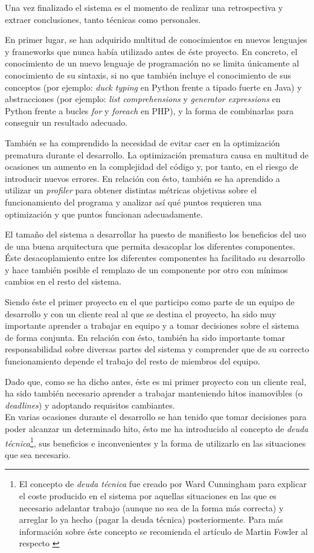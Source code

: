 Una vez finalizado el sistema es el momento de realizar una retrospectiva y extraer
conclusiones, tanto técnicas como personales.

En primer lugar, se han adquirido multitud de conocimientos en nuevos lenguajes y 
frameworks que nunca había utilizado antes de éste proyecto.  En concreto, el 
conocimiento de un nuevo lenguaje de programación no se limita únicamente al 
conocimiento de su sintaxis, si no que también incluye el conocimiento
de sus conceptos (por ejemplo: \textit{duck typing} en Python frente a tipado fuerte en Java)
y abstracciones (por ejemplo: \textit{list comprehensions} y \textit{generator expressions} en Python frente a bucles \textit{for}
y \textit{foreach} en PHP), y la forma de combinarlas para conseguir un resultado
adecuado.

También se ha comprendido la necesidad de evitar caer en la optimización prematura
durante el desarrollo.  La optimización prematura causa en multitud de ocasiones 
un aumento en la complejidad del código y, por tanto, en el riesgo de introducir nuevos
errores.  En relación con ésto, también se ha aprendido a utilizar un
\textit{profiler} para obtener distintas métricas objetivas sobre el funcionamiento del
programa y analizar así qué puntos requieren una optimización y que puntos 
funcionan adecuadamente.

El tamaño del sistema a desarrollar ha puesto de manifiesto los beneficios del
uso de una buena arquitectura que permita desacoplar los diferentes componentes.
Éste desacoplamiento entre los diferentes componentes ha facilitado su desarrollo
y hace también posible el remplazo de un componente por otro con mínimos cambios
en el resto del sistema.

Siendo éste el primer proyecto en el que participo como parte de un equipo de 
desarrollo y con un cliente real al que se destina el proyecto, ha sido muy
importante aprender a trabajar en equipo y a tomar decisiones sobre el sistema
de forma conjunta.  En relación con ésto, también ha sido importante tomar
responsabilidad sobre diversas partes del sistema y comprender que de su correcto
funcionamiento depende el trabajo del resto de miembros del equipo.

Dado que, como se ha dicho antes, éste es mi primer proyecto con un cliente real,
ha sido también necesario aprender a trabajar manteniendo hitos inamovibles 
(o \textit{deadlines}) y adoptando requisitos cambiantes.\\
En varias ocasiones durante el desarrollo se han tenido que tomar decisiones
para poder alcanzar un determinado hito, ésto me ha introducido al concepto de
\textit{deuda técnica}\footnote{El concepto de \textit{deuda técnica} fue creado por
Ward Cunningham para explicar el coste producido en el sistema por aquellas situaciones
en las que es necesario adelantar trabajo (aunque no sea de la forma más correcta) y
arreglar lo ya hecho (pagar la deuda técnica) posteriormente.  Para más información
sobre éste concepto se recomienda el artículo de Martin Fowler al respecto \cite{mfowler:technical_debt}},
sus beneficios e inconvenientes y la forma de utilizarlo en las situaciones que sea necesario.


